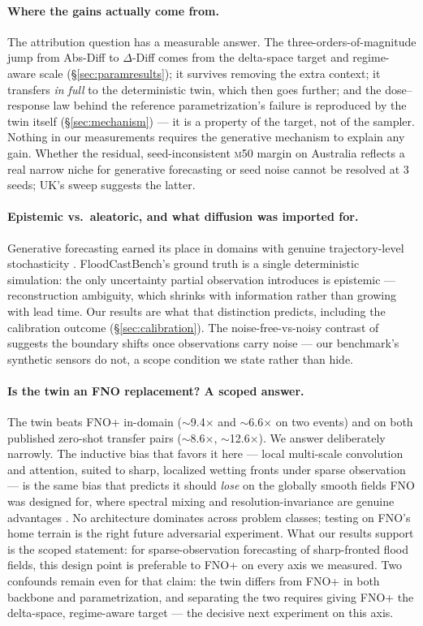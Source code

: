 \documentclass[11pt]{article}
\newcommand{\ours}{\mbox{$\Delta$-Diff}}
\newcommand{\absdiff}{\mbox{Abs-Diff}}
\newcommand{\mfifty}{\textsc{m50}}
\begin{document}
\paragraph{Where the gains actually come from.} The attribution question
has a measurable answer. The three-orders-of-magnitude jump from
\absdiff{} to \ours{} comes from the delta-space target and regime-aware
scale (\S\ref{sec:paramresults}); it survives removing the extra context;
it transfers \emph{in full} to the deterministic twin, which then goes
further; and the dose--response law behind the reference
parametrization's failure is reproduced by the twin itself
(\S\ref{sec:mechanism}) --- it is a property of the target, not of the
sampler. Nothing in our measurements requires the generative mechanism to
explain any gain. Whether the residual, seed-inconsistent \mfifty{}
margin on Australia reflects a real narrow niche for generative
forecasting or seed noise cannot be resolved at 3 seeds; UK's sweep
suggests the latter.

\paragraph{Epistemic vs.\ aleatoric, and what diffusion was imported
for.} Generative forecasting earned its place in domains with genuine
trajectory-level stochasticity \citep{gencast2024}. FloodCastBench's
ground truth is a single deterministic simulation: the only uncertainty
partial observation introduces is epistemic --- reconstruction ambiguity,
which shrinks with information rather than growing with lead time. Our
results are what that distinction predicts, including the calibration
outcome (\S\ref{sec:calibration}). The noise-free-vs-noisy contrast of
\citet{spatiallyawarediffusion2024} suggests the boundary shifts once
observations carry noise --- our benchmark's synthetic sensors do not, a
scope condition we state rather than hide.

\paragraph{Is the twin an FNO replacement? A scoped answer.} The twin
beats FNO+ in-domain ($\sim$9.4$\times$ and $\sim$6.6$\times$ on two
events) and on both published zero-shot transfer pairs
($\sim$8.6$\times$, $\sim$12.6$\times$). We answer deliberately narrowly.
The inductive bias that favors it here --- local multi-scale convolution
and attention, suited to sharp, localized wetting fronts under sparse
observation --- is the same bias that predicts it should \emph{lose} on
the globally smooth fields FNO was designed for, where spectral mixing
and resolution-invariance are genuine advantages \citep{li2021fno}. No
architecture dominates across problem classes; testing on FNO's home
terrain is the right future adversarial experiment. What our results
support is the scoped statement: for sparse-observation forecasting of
sharp-fronted flood fields, this design point is preferable to FNO+ on
every axis we measured. Two confounds remain even for that claim: the
twin differs from FNO+ in both backbone and parametrization, and
separating the two requires giving FNO+ the delta-space, regime-aware
target --- the decisive next experiment on this axis.
\end{document}
